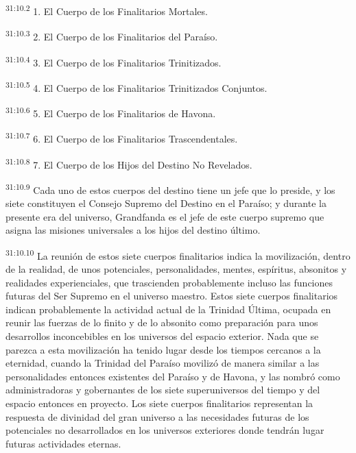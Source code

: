 \par
\textsuperscript{31:10.2} 1. El Cuerpo de los Finalitarios Mortales.

\par
\textsuperscript{31:10.3} 2. El Cuerpo de los Finalitarios del Paraíso.

\par
\textsuperscript{31:10.4} 3. El Cuerpo de los Finalitarios Trinitizados.

\par
\textsuperscript{31:10.5} 4. El Cuerpo de los Finalitarios Trinitizados Conjuntos.

\par
\textsuperscript{31:10.6} 5. El Cuerpo de los Finalitarios de Havona.

\par
\textsuperscript{31:10.7} 6. El Cuerpo de los Finalitarios Trascendentales.

\par
\textsuperscript{31:10.8} 7. El Cuerpo de los Hijos del Destino No Revelados.

\par
\textsuperscript{31:10.9} Cada uno de estos cuerpos del destino tiene un jefe que lo preside, y los siete constituyen el Consejo Supremo del Destino en el Paraíso; y durante la presente era del universo, Grandfanda es el jefe de este cuerpo supremo que asigna las misiones universales a los hijos del destino último.

\par
\textsuperscript{31:10.10} La reunión de estos siete cuerpos finalitarios indica la movilización, dentro de la realidad, de unos potenciales, personalidades, mentes, espíritus, absonitos y realidades experienciales, que trascienden probablemente incluso las funciones futuras del Ser Supremo en el universo maestro. Estos siete cuerpos finalitarios indican probablemente la actividad actual de la Trinidad Última, ocupada en reunir las fuerzas de lo finito y de lo absonito como preparación para unos desarrollos inconcebibles en los universos del espacio exterior. Nada que se parezca a esta movilización ha tenido lugar desde los tiempos cercanos a la eternidad, cuando la Trinidad del Paraíso movilizó de manera similar a las personalidades entonces existentes del Paraíso y de Havona, y las nombró como administradoras y gobernantes de los siete superuniversos del tiempo y del espacio entonces en proyecto. Los siete cuerpos finalitarios representan la respuesta de divinidad del gran universo a las necesidades futuras de los potenciales no desarrollados en los universos exteriores donde tendrán lugar futuras actividades eternas.

